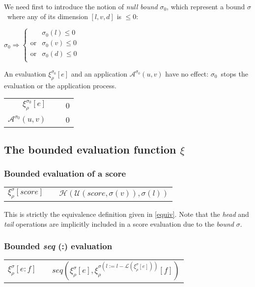 \documentclass[10pt,a4paper,frenchb]{article}
\makeatletter
\newcommand{\evaltable}[1][$\rightarrow$]	  {\begin{center} \begin{tabular*}{\linewidth}{rc@{ #1 }l}}
\newcommand{\evaltitle}[1]		{\multicolumn{3}{l}{#1} \\ \hline}
\newcommand{\evaltablend}  		{\end{tabular*}\end{center}}
\newcommand{\boundevalsym}		{\ensuremath{\xi}}
\newcommand{\envsym}				{\ensuremath{\rho}}
\newcommand{\applysym}			{\ensuremath{\mathcal A}}
\newcommand{\boundapplysym}[1]	{\ensuremath{\applysym^{#1}}}
\newcommand{\eval}[1]				{\ensuremath{\boundevalsym_\envsym^{#1}}}
\newcommand{\evalexpr}[2][\bounds]	{\ensuremath{\eval{#1}\left[#2\right]}}
\newcommand{\apply}[3][\bounds]		{\ensuremath{\boundapplysym{#1}\left(#2,#3\right)}}
\newcommand{\result}[2]				{#1}
\newcommand{\equivalence}[1]			{\ensuremath{\head( \top (#1, \bounds(v)), \bounds(l))}}
\newcommand{\opexpr}[1] 		{e #1 f}
\newcommand{\ra}	{\ensuremath{\rightarrow}}
\newcommand{\seq}			{:}
\newcommand{\length}			{\ensuremath{\mathcal L}}
\newcommand{\head}			{\ensuremath{\mathcal H}}
\renewcommand{\top}			{\ensuremath{\mathcal U}}
\newcommand{\bounds}			{\ensuremath{\sigma}}
\newcommand{\nullbounds}		{\ensuremath{\sigma_0}}
\newcommand{\seqOp}[2]		{\ensuremath{seq\left(#1, #2\right)}}
\newcommand{\bevalScore}[1]	{\ensuremath{\equivalence{#1}}}
\newcommand{\bevalSeq}[2]	{\ensuremath{\seqOp{\evalexpr{#1}}{\evalexpr[\bounds(l:=l- \length(\evalexpr{#1}))]{#2}}}}
\makeatother
\begin{document}
We need first to introduce the notion of \emph{null bound} \nullbounds, which represent a bound \bounds \ where any of its dimension  $[l, v, d]$ is $\leq 0$:
\begin{center}
$\nullbounds \Rightarrow \left\{ \begin{array}{ll}
 										 &  \nullbounds(l) \leq 0 \\
 								\mathrm{or} &  \nullbounds(v) \leq 0 \\
 								\mathrm{or} &  \nullbounds(d) \leq 0 \\
	 							\end{array} \right.$
\end{center}
An evaluation $\evalexpr[\nullbounds]{e}$ and an application $\apply[\nullbounds]{u}{v}$ have no effect: \nullbounds \ stops the evaluation or the application process.
\begin{center}
\begin{tabular}{rc@{\ra}l}
 $\evalexpr[\nullbounds]{e}$ 		& & \ $\result{0}{\bounds(l:=0, v:=0, d:=0)}$ \\
 $\apply[\nullbounds]{u}{v}$  		& & \ $\result{0}{\bounds(l:=0, v:=0, d:=0)}$
\end{tabular}
\end{center}


\subsection{The bounded evaluation function \boundevalsym}

\subsubsection{Bounded evaluation of a score}
\evaltable
  $\evalexpr{score}$	& & \bevalScore{score} 
\evaltablend

This is strictly the equivalence definition given in \ref{equiv}. Note that the \emph{head} and \emph{tail} operations are implicitly included in a score evaluation due to the \emph{bound} $\bounds$.

\subsubsection{Bounded \emph{seq} (\seq) evaluation}
\evaltable
 $\evalexpr{\opexpr{\seq}}$	 	&  &  \bevalSeq{e}{f}
\evaltablend
\end{document}
